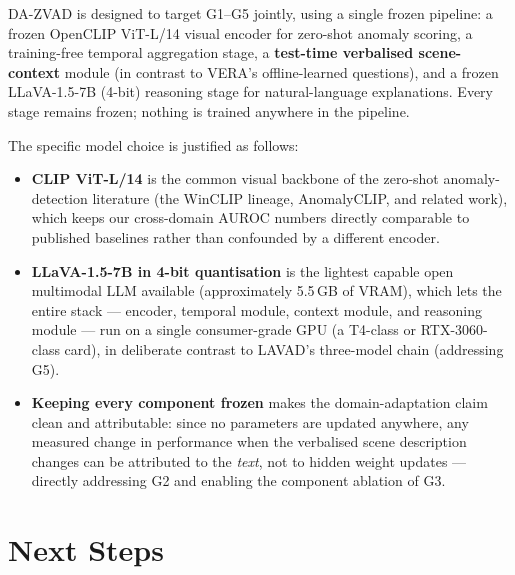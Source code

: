 \documentclass[12pt, a4paper]{article}
\begin{document}
DA-ZVAD is designed to target G1--G5 jointly, using a single frozen pipeline:
a frozen OpenCLIP ViT-L/14 visual encoder for zero-shot anomaly scoring, a
training-free temporal aggregation stage, a \textbf{test-time verbalised
scene-context} module (in contrast to VERA's offline-learned questions), and
a frozen LLaVA-1.5-7B (4-bit) reasoning stage for natural-language
explanations. Every stage remains frozen; nothing is trained anywhere in the
pipeline.

The specific model choice is justified as follows:

\begin{itemize}[leftmargin=1.6em, itemsep=0.4em]
    \item \textbf{CLIP ViT-L/14} is the common visual backbone of the
    zero-shot anomaly-detection literature (the WinCLIP lineage, AnomalyCLIP,
    and related work), which keeps our cross-domain AUROC numbers directly
    comparable to published baselines rather than confounded by a different
    encoder.
    \item \textbf{LLaVA-1.5-7B in 4-bit quantisation} is the lightest capable
    open multimodal LLM available (approximately 5.5\,GB of VRAM), which lets
    the entire stack --- encoder, temporal module, context module, and
    reasoning module --- run on a single consumer-grade GPU (a T4-class or
    RTX-3060-class card), in deliberate contrast to LAVAD's three-model
    chain (addressing G5).
    \item \textbf{Keeping every component frozen} makes the domain-adaptation
    claim clean and attributable: since no parameters are updated anywhere,
    any measured change in performance when the verbalised scene description
    changes can be attributed to the \textit{text}, not to hidden weight
    updates --- directly addressing G2 and enabling the component ablation
    of G3.
\end{itemize}

\section{Next Steps}
\end{document}
